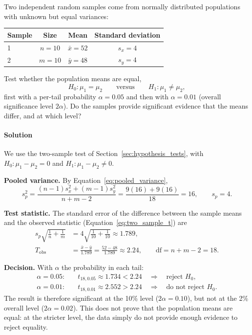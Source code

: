 Two independent random samples come from normally distributed populations with unknown but equal variances:
\begin{center}
\begin{tabular}{lccc}
\toprule
Sample & Size & Mean & Standard deviation \\
\midrule
1 & $n = 10$ & $\bar{x} = 52$ & $s_x = 4$ \\
2 & $m = 10$ & $\bar{y} = 48$ & $s_y = 4$ \\
\bottomrule
\end{tabular}
\end{center}
Test whether the population means are equal,
\begin{equation*}
H_0\colon \mu_1 = \mu_2 \qquad \text{versus} \qquad H_1\colon \mu_1 \neq \mu_2,
\end{equation*}
first with a per-tail probability $\alpha = 0.05$ and then with $\alpha = 0.01$ (overall significance level $2\alpha$). Do the samples provide significant evidence that the means differ, and at which level?

\paragraph{Solution} We use the two-sample test of Section~\ref{sec:hypothesis_tests}, with $H_0\colon \mu_1 - \mu_2 = 0$ and $H_1\colon \mu_1 - \mu_2 \neq 0$.

\textbf{Pooled variance.} By Equation~\eqref{eq:pooled_variance},
\begin{equation*}
s_p^2 = \frac{(n - 1)s_x^2 + (m - 1)s_y^2}{n + m - 2} = \frac{9(16) + 9(16)}{18} = 16, \qquad s_p = 4.
\end{equation*}

\textbf{Test statistic.} The standard error of the difference between the sample means and the observed statistic (Equation~\eqref{eq:two_sample_t}) are
\begin{align*}
s_p\sqrt{\frac{1}{n} + \frac{1}{m}} &= 4\sqrt{\frac{1}{10} + \frac{1}{10}} \approx 1.789, \\[1ex]
T_{\text{obs}} &= \frac{\bar{x} - \bar{y}}{1.789} = \frac{52 - 48}{1.789} \approx 2.24, \qquad \text{df} = n + m - 2 = 18.
\end{align*}

\textbf{Decision.} With $\alpha$ the probability in each tail:
\begin{align*}
\alpha = 0.05: &\quad t_{18,0.05} \approx 1.734 < 2.24 \quad \Longrightarrow \quad \text{reject } H_0, \\
\alpha = 0.01: &\quad t_{18,0.01} \approx 2.552 > 2.24 \quad \Longrightarrow \quad \text{do not reject } H_0.
\end{align*}
The result is therefore significant at the 10\% level ($2\alpha = 0.10$), but not at the 2\% overall level ($2\alpha = 0.02$). This does not prove that the population means are equal: at the stricter level, the data simply do not provide enough evidence to reject equality.

